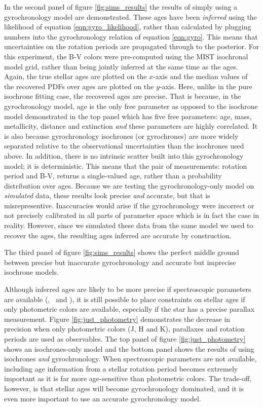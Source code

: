 In the second panel of figure \ref{fig:sims_results} the results of simply
using a gyrochronology model are demonstrated.
These ages have been {\it inferred} using the likelihood of equation
\ref{eqn:gyro_likelihood}, rather than calculated by plugging numbers into the
gyrochronology relation of equation \ref{eqn:gyro}.
This means that uncertainties on the rotation periods are propagated through
to the posterior.
For this experiment, the B-V colors were pre-computed using the MIST
isochronal model grid, rather than being jointly inferred at the same time as
the ages.
Again, the true stellar ages are plotted on the $x$-axis and the median values
of the recovered PDFs over ages are plotted on the $y$-axis.
Here, unlike in the pure isochrone fitting case, the recovered ages are
precise.
That is because, in the gyrochronology model, age is the only free parameter
as opposed to the isochrone model demonstrated in the top panel which has five
free parameters: age, mass, metallicity, distance and extinction {\it and}
these parameters are highly correlated.
It is also because gyrochronology isochrones (or gyrochrones) are more widely
separated relative to the observational uncertainties than the isochrones used
above.
In addition, there is no intrinsic scatter built into this gyrochronology
model; it is deterministic.
This means that the pair of measurements: rotation period and B-V, returns a
single-valued age, rather than a probability distribution over ages.
Because we are testing the gyrochronology-only model on {\it simulated} data,
these results look precise {\it and} accurate, but that is misrepresentive.
Inaccuracies would arise if the gyrochronology were incorrect or not precisely
calibrated in all parts of parameter space which is in fact the case in
reality.
However, since we simulated these data from the same model we used to recover
the ages, the resulting ages inferred are accurate by construction.

The third panel of figure \ref{fig:sims_results} shows the perfect middle
ground between precise but inaccurate gyrochronology and accurate but
imprecise isochrone models.

Although inferred ages are likely to be more precise if spectroscopic
parameters are available (\teff, \logg\ and \feh), it is still possible to
place constraints on stellar ages if only photometric colors are available,
especially if the star has a precise parallax measurement.
Figure \ref{fig:just_photometry} demonstrates the decrease in precision when
only photometric colors (J, H and K), parallaxes and rotation periods are
used as observables.
The top panel of figure \ref{fig:just_photometry} shows an isochrones-only
model and the bottom panel shows the results of using isochrones {\it and}
gyrochronology.
When spectroscopic parameters are not available, including age information
from a stellar rotation period becomes extremely important as it is far more
age-sensitive than photometric colors.
The trade-off, however, is that stellar ages will become gyrochronology
dominated, and it is even more important to use an accurate gyrochronology
model.

